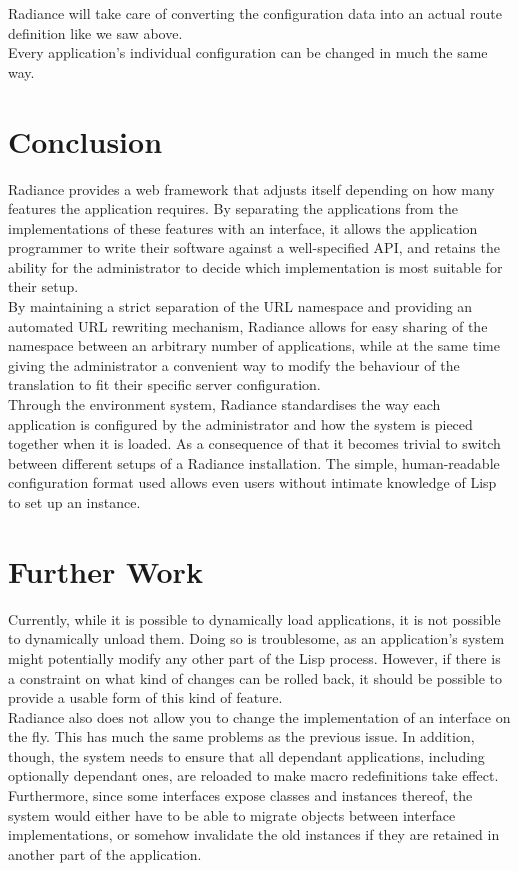 \documentclass{sig-alternate}
\begin{document}
Radiance will take care of converting the configuration data into an actual route definition like we saw above. \\

Every application's individual configuration can be changed in much the same way.

\section{Conclusion}
Radiance provides a web framework that adjusts itself depending on how many features the application requires. By separating the applications from the implementations of these features with an interface, it allows the application programmer to write their software against a well-specified API, and retains the ability for the administrator to decide which implementation is most suitable for their setup. \\

By maintaining a strict separation of the URL namespace and providing an automated URL rewriting mechanism, Radiance allows for easy sharing of the namespace between an arbitrary number of applications, while at the same time giving the administrator a convenient way to modify the behaviour of the translation to fit their specific server configuration. \\

Through the environment system, Radiance standardises the way each application is configured by the administrator and how the system is pieced together when it is loaded. As a consequence of that it becomes trivial to switch between different setups of a Radiance installation. The simple, human-readable configuration format used allows even users without intimate knowledge of Lisp to set up an instance.

\section{Further Work}
Currently, while it is possible to dynamically load applications, it is not possible to dynamically unload them. Doing so is troublesome, as an application's system might potentially modify any other part of the Lisp process. However, if there is a constraint on what kind of changes can be rolled back, it should be possible to provide a usable form of this kind of feature. \\

Radiance also does not allow you to change the implementation of an interface on the fly. This has much the same problems as the previous issue. In addition, though, the system needs to ensure that all dependant applications, including optionally dependant ones, are reloaded to make macro redefinitions take effect. Furthermore, since some interfaces expose classes and instances thereof, the system would either have to be able to migrate objects between interface implementations, or somehow invalidate the old instances if they are retained in another part of the application. \\
\end{document}
